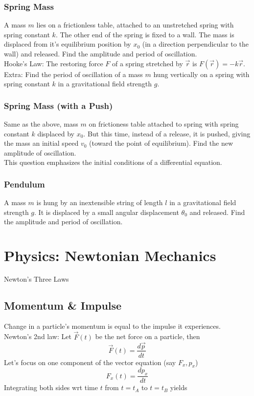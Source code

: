\documentclass{article}
\begin{document}
\subsubsection{Spring Mass}
A mass $m$ lies on a frictionless table, attached to an unstretched spring with spring constant $k$. The other end of the spring is fixed to a wall. The mass is displaced from it's equilibrium position by $x_0$ (in a direction perpendicular to the wall) and released. Find the amplitude and period of oscillation.\\[10pt]
Hooke's Law: The restoring force $F$ of a spring stretched by $\vec{r}$ is $F(\vec{r}) = -k\vec{r}$.\\[10pt]
Extra: Find the period of oscillation of a mass $m$ hung vertically on a spring with spring constant $k$ in a gravitational field strength $g$.

\subsubsection{Spring Mass (with a Push)}
Same as the above, mass $m$ on frictioness table attached to spring with spring constant $k$ displaced by $x_0$. But this time, instead of a release, it is pushed, giving the mass an initial speed $v_0$ (toward the point of equilibrium). Find the new amplitude of oscillation.\\[10pt]
This question emphasizes the initial conditions of a differential equation.

\subsubsection{Pendulum}
A mass $m$ is hung by an inextensible string of length $l$ in a gravitational field strength $g$. It is displaced by a small angular displacement $\theta_0$ and released. Find the amplitude and period of oscillation.

\section{Physics: Newtonian Mechanics}
Newton's Three Laws
\subsection{}
\subsection{Momentum \& Impulse}
Change in a particle's momentum is equal to the impulse it experiences. \\[10pt]
Newton's 2nd law: Let $\vec{F}(t)$ be the net force on a particle, then
$$\vec{F}(t) = \frac{d\vec{p}}{dt}$$
Let's focus on one component of the vector equation (say $F_x, p_x$)
$$F_x(t) = \frac{dp_x}{dt}$$
Integrating both sides wrt time $t$ from $t=t_A$ to $t=t_B$ yields
\end{document}
